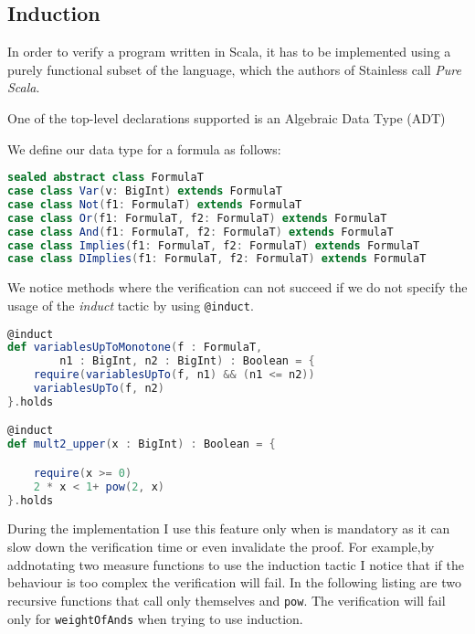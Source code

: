 \newpage

\subsection{Induction}

In order to verify a program written in Scala, it has to be implemented using a purely
functional subset of the language, which the authors of Stainless call \emph{Pure Scala}\cite{pure_scala}.

One of the top-level declarations supported is an Algebraic Data Type (ADT)\cite{pure_scala}

We define our data type for a formula as follows:

\begin{lstlisting}[language=Scala, caption={ \texttt{FormulaT} data type}]
sealed abstract class FormulaT
case class Var(v: BigInt) extends FormulaT
case class Not(f1: FormulaT) extends FormulaT
case class Or(f1: FormulaT, f2: FormulaT) extends FormulaT
case class And(f1: FormulaT, f2: FormulaT) extends FormulaT
case class Implies(f1: FormulaT, f2: FormulaT) extends FormulaT
case class DImplies(f1: FormulaT, f2: FormulaT) extends FormulaT
\end{lstlisting}

We notice methods where the verification can not succeed if we do not specify the usage of 
the \emph{induct} tactic by using \texttt{@induct}.

\begin{lstlisting}[language=Scala, caption={ Lemmas with mandatory induction}]
@induct
def variablesUpToMonotone(f : FormulaT, 
        n1 : BigInt, n2 : BigInt) : Boolean = {
    require(variablesUpTo(f, n1) && (n1 <= n2))
    variablesUpTo(f, n2)
}.holds

@induct
def mult2_upper(x : BigInt) : Boolean = {

    require(x >= 0)
    2 * x < 1+ pow(2, x)
}.holds
\end{lstlisting}

During the implementation I use this feature only when is mandatory as it 
can slow down the verification time or even invalidate the proof. 
For example,by addnotating two measure functions to use the induction tactic 
I notice that if the behaviour is too complex the verification will fail.
In the following listing are two recursive functions that call only themselves and 
\texttt{pow}. The verification will fail only for \texttt{weightOfAnds} when trying to use induction.

